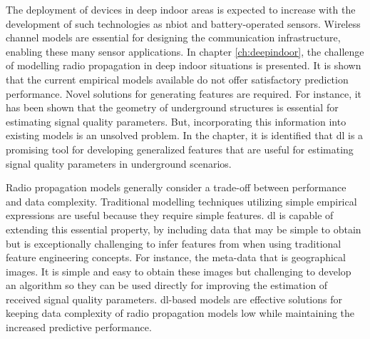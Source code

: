 The deployment of devices in deep indoor areas is expected to increase with the development of such technologies as \gls{nbiot} and battery-operated sensors. Wireless channel models are essential for designing the communication infrastructure, enabling these many sensor applications. In chapter \ref{ch:deepindoor}, the challenge of modelling radio propagation in deep indoor situations is presented. It is shown that the current empirical models available do not offer satisfactory prediction performance. Novel solutions for generating features are required. For instance, it has been shown that the geometry of underground structures is essential for estimating signal quality parameters. But, incorporating this information into existing models is an unsolved problem. In the chapter, it is identified that \gls{dl} is a promising tool for developing generalized features that are useful for estimating signal quality parameters in underground scenarios.

Radio propagation models generally consider a trade-off between performance and data complexity. Traditional modelling techniques utilizing simple empirical expressions are useful because they require simple features. \gls{dl} is capable of extending this essential property, by including data that may be simple to obtain but is exceptionally challenging to infer features from when using traditional feature engineering concepts. For instance, the meta-data that is geographical images. It is simple and easy to obtain these images but challenging to develop an algorithm so they can be used directly for improving the estimation of received signal quality parameters. \gls{dl}-based models are effective solutions for keeping data complexity of radio propagation models low while maintaining the increased predictive performance.
